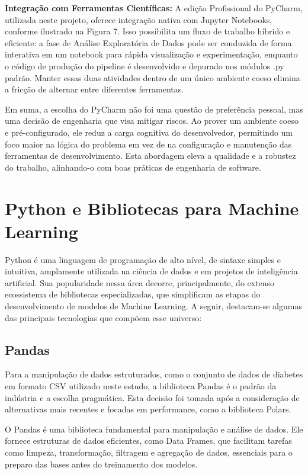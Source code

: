 \textbf{Integração com Ferramentas Científicas:} A edição Profissional do PyCharm, utilizada neste projeto, oferece integração nativa com Jupyter Notebooks, conforme ilustrado na Figura 7. Isso possibilita um fluxo de trabalho híbrido e eficiente: a fase de Análise Exploratória de Dados pode ser conduzida de forma interativa em um notebook para rápida visualização e experimentação, enquanto o código de produção do pipeline é desenvolvido e depurado nos módulos .py padrão. Manter essas duas atividades dentro de um único ambiente coeso elimina a fricção de alternar entre diferentes ferramentas.

Em suma, a escolha do PyCharm não foi uma questão de preferência pessoal, mas uma decisão de engenharia que visa mitigar riscos. Ao prover um ambiente coeso e pré-configurado, ele reduz a carga cognitiva do desenvolvedor, permitindo um foco maior na lógica do problema em vez de na configuração e manutenção das ferramentas de desenvolvimento. Esta abordagem eleva a qualidade e a robustez do trabalho, alinhando-o com boas práticas de engenharia de software.

\section{Python e Bibliotecas para Machine Learning}
Python é uma linguagem de programação de alto nível, de sintaxe simples e intuitiva, amplamente utilizada na ciência de dados e em projetos de inteligência artificial. Sua popularidade nessa área decorre, principalmente, do extenso ecossistema de bibliotecas especializadas, que simplificam as etapas do desenvolvimento de modelos de Machine Learning. A seguir, destacam-se algumas das principais tecnologias que compõem esse universo:

\subsection{Pandas}
Para a manipulação de dados estruturados, como o conjunto de dados de diabetes em formato CSV utilizado neste estudo, a biblioteca Pandas é o padrão da indústria e a escolha pragmática. Esta decisão foi tomada após a consideração de alternativas mais recentes e focadas em performance, como a biblioteca Polars.

O Pandas é uma biblioteca fundamental para manipulação e análise de dados. Ele fornece estruturas de dados eficientes, como Data Frames, que facilitam tarefas como limpeza, transformação, filtragem e agregação de dados, essenciais para o preparo das bases antes do treinamento dos modelos.\cite{McKinney2010} 

